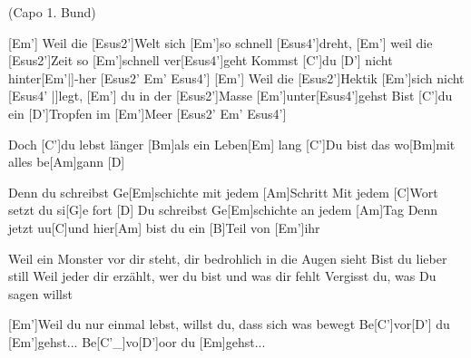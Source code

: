 
{\footnotesize(Capo 1. Bund)}

\begin{guitar}
	[Em'] Weil die [Esus2']Welt sich [Em']so schnell [Esus4']dreht, [Em'] weil die [Esus2']Zeit so [Em']schnell ver[Esus4']geht
	Kommst [C']du [D'] nicht hinter[Em'|]{-}her [Esus2' Em' Esus4']{}
	[Em'] Weil die [Esus2']Hektik [Em']sich nicht [Esus4' |]{legt,  }[Em'] du in der [Esus2']Masse [Em']unter[Esus4']gehst
	Bist [C']du ein [D']Tropfen im [Em']Meer [Esus2' Em' Esus4']{}
	
	Doch [C']du lebst länger [Bm]als ein Leben[Em] lang
	[C']Du bist das wo[Bm]mit alles be[Am]gann [D]{}
	
	Denn du schreibst Ge[Em]schichte mit jedem [Am]Schritt
	Mit jedem [C]Wort setzt du si[G]e fort [D]{}
	Du schreibst Ge[Em]schichte an jedem [Am]Tag
	Denn jetzt uu[C]und hier[Am] bist du ein [B]Teil von [Em']ihr
	
	Weil ein Monster vor dir steht, dir bedrohlich in die Augen sieht
	Bist du lieber still
	Weil jeder dir erzählt, wer du bist und was dir fehlt
	Vergisst du, was Du sagen willst
	
	 
	
	 
	
	[Em']Weil du nur einmal lebst, willst du, dass sich was bewegt
	Be[C']vor[D'] du [Em']gehst...
	Be[C'_]{vo}[D']oor du [Em]gehst...
	
	 
	
	 
\end{guitar}